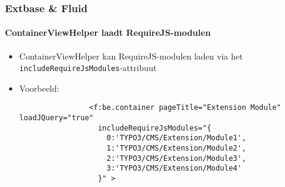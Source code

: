 
\begin{frame}[fragile]
	\frametitle{Extbase \& Fluid}
	\framesubtitle{ContainerViewHelper laadt RequireJS-modulen}

	\begin{itemize}

		\item ContainerViewHelper kan RequireJS-modulen laden via het \texttt{includeRequireJsModules}-attribuut

		\item Voorbeeld:

			\begin{lstlisting}
				<f:be.container pageTitle="Extension Module" loadJQuery="true"
				  includeRequireJsModules="{
				    0:'TYPO3/CMS/Extension/Module1',
				    1:'TYPO3/CMS/Extension/Module2',
				    2:'TYPO3/CMS/Extension/Module3',
				    3:'TYPO3/CMS/Extension/Module4'
				  }" >
			\end{lstlisting}

	\end{itemize}

\end{frame}


